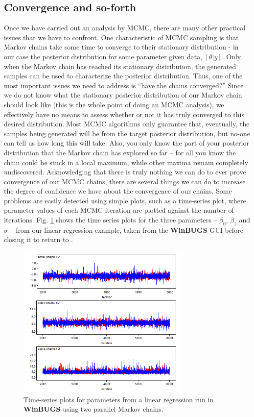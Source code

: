 \subsection{Convergence and so-forth}
\label{glms.sec.convergence}

Once we have carried out an analysis by MCMC, there are many other
practical issues that we have to confront. One characteristic of MCMC sampling is that Markov chains take some time to converge to their stationary distribution - in our case the posterior distribution for some parameter given data, $[\theta|y]$. Only when the Markov chain has reached
its stationary distribution, the generated samples can be used to
characterize the posterior distribution. Thus, one of the most important issues we need to address 
is ``have the chains converged?'' Since we do not know what the
stationary posterior distribution of our Markov chain should look like
(this is the whole point of doing an MCMC analysis), we
effectively have no means to assess whether or not it has truly converged to
this desired distribution. Most MCMC algorithms only guarantee
that, eventually, the samples being generated will be from the target
posterior distribution, but no-one can tell us how long this will
take. Also, you only know the part of your posterior distribution that
the Markov chain has explored so far -- for all you know the chain
could be stuck in a local maximum, while other maxima remain
completely undiscovered.  Acknowledging that there is truly nothing we
can do to ever prove convergence of our MCMC chains, there are several
things we can do to increase the degree of confidence we have about
the convergence of our chains. Some problems are easily detected using
simple plots, such as a time-series plot, where parameter values of each MCMC iteration are plotted against the number of iterations.  Fig. \ref{glms.fig.linreg} shows the time series plots for the three parameters -- $\beta_0$, $\beta_1$ and $\sigma$ -- from our linear regression example, taken from the {\bf WinBUGS} GUI before closing it to return to {\R}. 

\begin{figure}[ht]
\begin{center}
\includegraphics[height=3in]{Ch3-Bayes/figs/BUGSchains}
\end{center}
\caption{
Time-series plots for parameters from a linear regression run in {\bf WinBUGS} using two parallel Markov chains.}
\label{glms.fig.linreg}
\end{figure}

